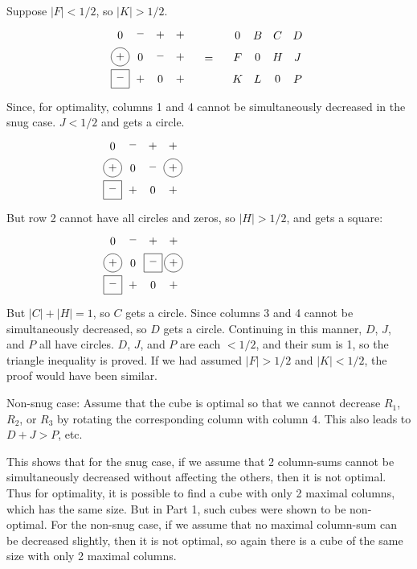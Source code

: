 Suppose $|F| < 1/2$, so $|K| > 1/2$.
\begin{equation*}
\myarrset
\begin{array}{cccc}
\ndcz & \ndcm & \ndcp & \ndcp \\
\dcp  & \ndcz & \ndsm & \ndcp \\
\dsm  & \ndcp & \ndcz & \ndsp
\end{array}
~~~=~~~
\myarrset
\begin{array}{cccc}
\ndc{$0$} & \ndc{$B$} & \ndc{$C$} & \ndc{$D$} \\
\ndc{$F$} & \ndc{$0$} & \ndc{$H$} & \ndc{$J$} \\
\ndc{$K$} & \ndc{$L$} & \ndc{$0$} & \ndc{$P$}
\end{array}
\end{equation*}
Since, for optimality, columns 1 and 4 cannot be simultaneously decreased in
the snug case. $J < 1/2$ and gets a circle.
\begin{equation*}
\myarrset
\begin{array}{cccc}
\ndcz & \ndcm & \ndcp & \ndcp \\
\dcp  & \ndcz & \ndsm & \dcp  \\
\dsm  & \ndcp & \ndcz & \ndsp
\end{array}
~~~~~~~~~~~~~~~~~~~~~~~~~~~~~~~~~~~
\end{equation*}
But row 2 cannot have all circles and zeros, so $|H| > 1/2$, and gets a
square:
\begin{equation*}
\myarrset
\begin{array}{cccc}
\ndcz & \ndcm & \ndcp & \ndcp \\
\dcp  & \ndcz & \dsm  & \dcp  \\
\dsm  & \ndcp & \ndcz & \ndsp
\end{array}
~~~~~~~~~~~~~~~~~~~~~~~~~~~~~~~~~~~
\end{equation*}
But $|C|+|H|=1$, so $C$ gets a circle.  Since columns 3 and 4 cannot be
simultaneously decreased, so $D$ gets a circle.  Continuing in this
manner, $D$, $J$, and $P$ all have circles.  $D$, $J$, and $P$ are each $<
1/2$, and their sum is 1, so the triangle inequality is proved.  If we had
assumed $|F| > 1/2$ and $|K| < 1/2$, the proof would have been similar.

Non-snug case:  Assume that the cube is optimal so that we cannot decrease
$R_1$, $R_2$, or $R_3$ by rotating the corresponding column with column 4.
This also leads to $D+J > P$, etc.

This shows that for the snug case, if we assume that 2 column-sums cannot be
simultaneously decreased without affecting the others, then it is not optimal.
Thus for optimality, it is possible to find a cube with only 2 maximal
columns, which has the same size.  But in Part 1, such cubes were shown to be
non-optimal.  For the non-snug case, if we assume that no maximal column-sum
can be decreased slightly, then it is not optimal, so again there is a cube of
the same size with only 2 maximal columns.

